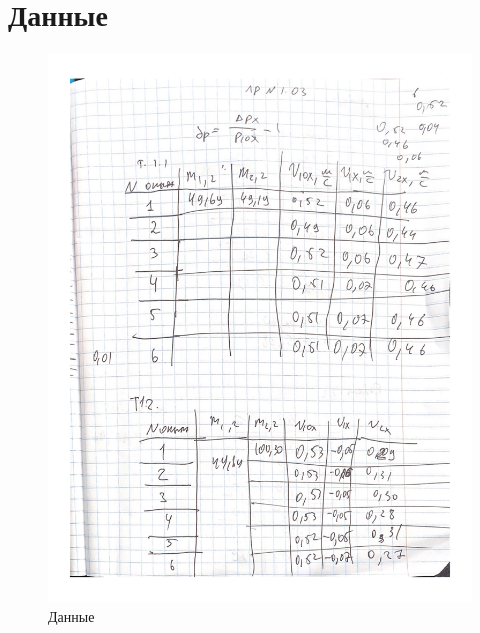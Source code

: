 \documentclass[a4paper]{article}
\begin{document}
\section{\bf{Данные}}
\begin{figure}[H]
\includegraphics[width=\textwidth, scale=0.5]{1-1.png}
\caption{Данные}
\end{figure}
\end{document}
